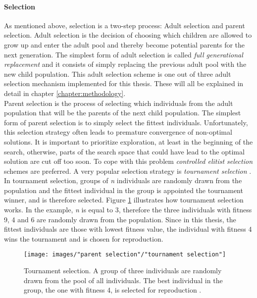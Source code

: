 \paragraph*{Selection}
As mentioned above, selection is a two-step process: Adult selection and parent selection. Adult selection is the decision of choosing which children are allowed to grow up and enter the adult pool and thereby become potential parents for the next generation. The simplest form of adult selection is called \textit{full generational replacement} and it consists of simply replacing the previous adult pool with the new child population. This adult selection scheme is one out of three adult selection mechanism implemented for this thesis. These will all be explained in detail in chapter \ref{chapter:methodology}.\\

\noindent Parent selection is the process of selecting which individuals from the adult population that will be the parents of the next child population. The simplest form of parent selection is to simply select the fittest individuals. Unfortunately, this selection strategy often leads to premature convergence of non-optimal solutions. It is important to prioritize exploration, at least in the beginning of the search, otherwise, parts of the search space that could have lead to the optimal solution are cut off too soon. To cope with this problem \textit{controlled elitist selection} schemes are preferred. A very popular selection strategy is \textit{tournament selection} \citep{Razali}. In tournament selection, groups of \textit{n} individuals are randomly drawn from the population and the fittest individual in the group is appointed the tournament winner, and is therefore selected. Figure \ref{Tournament selection} illustrates how tournament selection works. In the example, \textit{n} is equal to 3, therefore the three individuals with fitness 9, 4 and 6 are randomly drawn from the population. Since in this thesis, the fittest individuals are those with lowest fitness value, the individual with fitness 4 wins the tournament and is chosen for reproduction.\\


\begin{figure}[h!]
\begin{center}
\texttt{[image: images/"parent selection"/"tournament selection"]}
\caption{Tournament selection. A group of three individuals are randomly drawn from the pool of all individuals. The best individual  in the group, the one with fitness 4, is selected for reproduction \citep{Razali}.}
\label{Tournament selection}
\end{center}
\end{figure}


